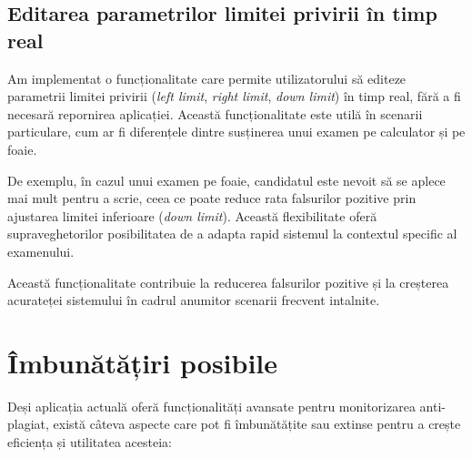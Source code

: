 \documentclass[12pt,a4paper]{article}
\begin{document}
\subsection{Editarea parametrilor limitei privirii în timp real}
Am implementat o funcționalitate care permite utilizatorului să editeze parametrii limitei privirii (\textit{left limit}, \textit{right limit}, \textit{down limit}) în timp real, fără a fi necesară repornirea aplicației. Această funcționalitate este utilă în scenarii particulare, cum ar fi diferențele dintre susținerea unui examen pe calculator și pe foaie. 

De exemplu, în cazul unui examen pe foaie, candidatul este nevoit să se aplece mai mult pentru a scrie, ceea ce poate reduce rata falsurilor pozitive prin ajustarea limitei inferioare (\textit{down limit}). Această flexibilitate oferă supraveghetorilor posibilitatea de a adapta rapid sistemul la contextul specific al examenului.

Această funcționalitate contribuie la reducerea falsurilor pozitive și la creșterea acurateței sistemului în cadrul anumitor scenarii frecvent intalnite.

\section{Îmbunătățiri posibile}

Deși aplicația actuală oferă funcționalități avansate pentru monitorizarea anti-plagiat, există câteva aspecte care pot fi îmbunătățite sau extinse pentru a crește eficiența și utilitatea acesteia:
\end{document}
